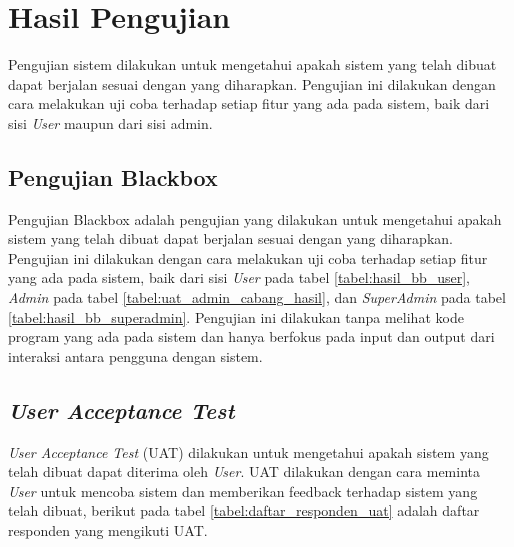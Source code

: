 \section{Hasil Pengujian}

Pengujian sistem dilakukan untuk mengetahui apakah sistem yang telah dibuat dapat berjalan sesuai dengan yang diharapkan. Pengujian ini dilakukan dengan cara melakukan uji coba terhadap setiap fitur yang ada pada sistem, baik dari sisi \textit{User} maupun dari sisi admin.

\subsection{Pengujian Blackbox}

Pengujian Blackbox adalah pengujian yang dilakukan untuk mengetahui apakah sistem yang telah dibuat dapat berjalan sesuai dengan yang diharapkan. Pengujian ini dilakukan dengan cara melakukan uji coba terhadap setiap fitur yang ada pada sistem, baik dari sisi \textit{User} pada tabel \ref{tabel:hasil_bb_user}, \textit{Admin} pada tabel \ref{tabel:uat_admin_cabang_hasil}, dan \textit{SuperAdmin} pada tabel \ref{tabel:hasil_bb_superadmin}. Pengujian ini dilakukan tanpa melihat kode program yang ada pada sistem dan hanya berfokus pada input dan output dari interaksi antara pengguna dengan sistem.





\subsection{\textit{User Acceptance Test}}

\textit{User Acceptance Test} (UAT) dilakukan untuk mengetahui apakah sistem yang telah dibuat dapat diterima oleh \textit{User}. UAT dilakukan dengan cara meminta \textit{User} untuk mencoba sistem dan memberikan feedback terhadap sistem yang telah dibuat, berikut pada tabel \ref{tabel:daftar_responden_uat} adalah daftar responden yang mengikuti UAT.


